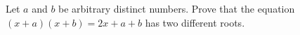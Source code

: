 Let $a$ and $b$ be arbitrary distinct numbers.
Prove that the equation $(x +a) (x+b)=2x+a+b$ has two different roots.